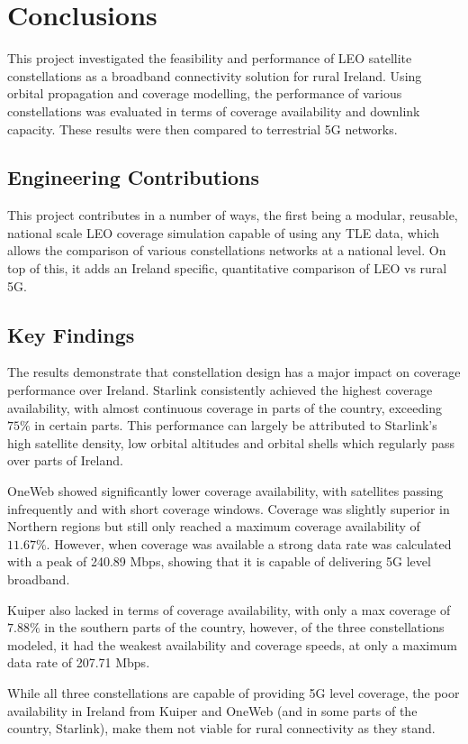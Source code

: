 \chapter{Conclusions} \label{chapter:6}
This project investigated the feasibility and performance of LEO satellite constellations as a broadband connectivity solution for rural Ireland. Using orbital propagation and coverage modelling, the performance of various constellations was evaluated in terms of coverage availability and downlink capacity. These results were then compared to terrestrial 5G networks. 

\section{Engineering Contributions}
This project contributes in a number of ways, the first being a modular, reusable, national scale LEO coverage simulation capable of using any TLE data, which allows the comparison of various constellations networks at a national level. On top of this, it adds an Ireland specific, quantitative comparison of LEO vs rural 5G.
\section{Key Findings}
The results demonstrate that constellation design has a major impact on coverage performance over Ireland. Starlink consistently achieved the highest coverage availability, with almost continuous coverage in parts of the country, exceeding $75\%$ in certain parts. This performance can largely be attributed to Starlink's high satellite density, low orbital altitudes and orbital shells which regularly pass over parts of Ireland.

OneWeb showed significantly lower coverage availability, with satellites passing infrequently and with short coverage windows. Coverage was slightly superior in Northern regions but still only reached a maximum coverage availability of $11.67\%$. However, when coverage was available a strong data rate was calculated with a peak of 240.89 Mbps, showing that it is capable of delivering 5G level broadband. 

Kuiper also lacked in terms of coverage availability, with only a max coverage of $7.88\%$ in the southern parts of the country, however, of the three constellations modeled, it had the weakest availability and coverage speeds, at only a maximum data rate of 207.71 Mbps. 

While all three constellations are capable of providing 5G level coverage, the poor availability in Ireland from Kuiper and OneWeb (and in some parts of the country, Starlink), make them not viable for rural connectivity as they stand. 

